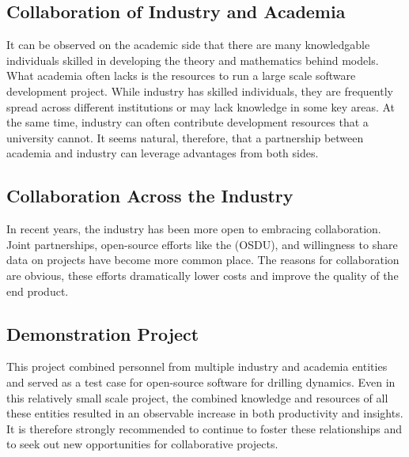 \subsection{Collaboration of Industry and Academia}
It can be observed on the academic side that there are many knowledgable individuals skilled in developing the theory and mathematics behind models.  What academia often lacks is the resources to run a large scale software development project.  While industry has skilled individuals, they are frequently spread across different institutions or may lack knowledge in some key areas.  At the same time, industry can often contribute development resources that a university cannot.  It seems natural, therefore, that a partnership between academia and industry can leverage advantages from both sides.

\subsection{Collaboration Across the Industry}
In recent years, the industry has been more open to embracing collaboration.  Joint partnerships, open-source efforts like the \osdu{} (OSDU), and willingness to share data on projects have become more common place.  The reasons for collaboration are obvious, these efforts dramatically lower costs and improve the quality of the end product.

\subsection{Demonstration Project}
This project combined personnel from multiple industry and academia entities and served as a test case for open-source software for drilling dynamics.  Even in this relatively small scale project, the combined knowledge and resources of all these entities resulted in an observable increase in both productivity and insights.  It is therefore strongly recommended to continue to foster these relationships and to seek out new opportunities for collaborative projects.



